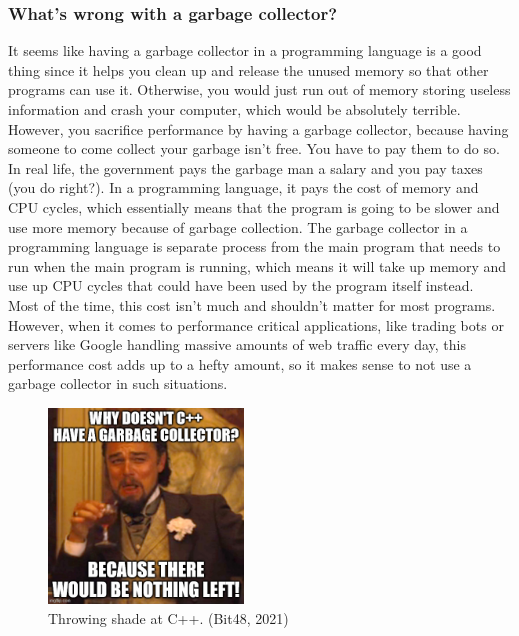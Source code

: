\documentclass[11pt]{article}
\makeatletter
\newcommand{\citeprocitem}[2]{\hyper@linkstart{cite}{citeproc_bib_item_#1}#2\hyper@linkend}
\makeatother
\begin{document}
\subsubsection{What's wrong with a garbage collector?}
\label{sec:org03a4148}
It seems like having a garbage collector in a programming
language is a good thing since it helps you clean up
and release the unused memory so that other programs
can use it. Otherwise, you would just run out of memory
storing useless information and crash your computer,
which would be absolutely terrible.  \\

However, you sacrifice performance by having a garbage
collector, because having someone to come collect your
garbage isn't free. You have to pay them to do so. In real life,
the government pays the garbage man a salary and you pay taxes
(you do right?). In a programming language,
it pays the cost of memory and CPU cycles,
which essentially means that the program is going to be slower
and use more memory because of garbage collection.
The garbage collector in a programming language is
separate process from the main program that needs to run when
the main program is running, which means it will take up
memory and use up CPU cycles that could have been used by
the program itself instead.  \\

Most of the time, this cost isn't much and shouldn't matter
for most programs. However, when it comes to performance
critical applications, like trading bots or servers
like Google handling massive amounts of web traffic every day,
this performance cost adds up to a hefty amount, so it makes
sense to not use a garbage collector in such situations.

\begin{figure}[htbp]
\centering
\includegraphics[height=14em]{./images/cpp-being-garbage.jpg}
\caption{Throwing shade at C++. (\citeprocitem{5}{Bit48, 2021})}
\end{figure}
\end{document}
